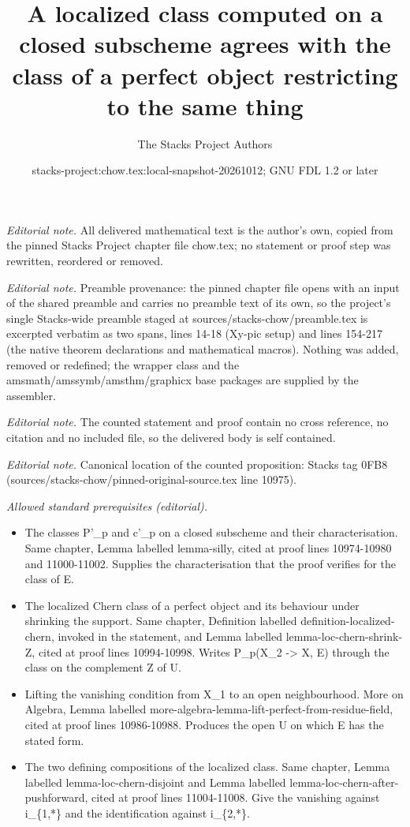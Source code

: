 \documentclass[10pt,a4paper]{amsart}
\title{A localized class computed on a closed subscheme agrees with the class of a perfect object restricting to the same thing}
\author{The Stacks Project Authors}
\date{stacks-project:chow.tex:local-snapshot-20261012; GNU FDL 1.2 or later}
\theoremstyle{plain}
\theoremstyle{definition}
\theoremstyle{remark}
\numberwithin{equation}{subsection}
\begin{document}
\maketitle
\noindent\textit{Editorial note.} All delivered mathematical text is the author's own, copied from the pinned Stacks Project chapter file chow.tex; no statement or proof step was rewritten, reordered or removed.\par\medskip
\noindent\textit{Editorial note.} Preamble provenance: the pinned chapter file opens with an input of the shared preamble and carries no preamble text of its own, so the project's single Stacks-wide preamble staged at sources/stacks-chow/preamble.tex is excerpted verbatim as two spans, lines 14-18 (Xy-pic setup) and lines 154-217 (the native theorem declarations and mathematical macros). Nothing was added, removed or redefined; the wrapper class and the amsmath/amssymb/amsthm/graphicx base packages are supplied by the assembler.\par\medskip
\noindent\textit{Editorial note.} The counted statement and proof contain no cross reference, no citation and no included file, so the delivered body is self contained.\par\medskip
\noindent\textit{Editorial note.} Canonical location of the counted proposition: Stacks tag 0FB8 (sources/stacks-chow/pinned-original-source.tex line 10975).\par\medskip
\noindent\textit{Allowed standard prerequisites (editorial).}\begin{itemize}
\item The classes P'\_p and c'\_p on a closed subscheme and their characterisation. Same chapter, Lemma labelled lemma-silly, cited at proof lines 10974-10980 and 11000-11002. Supplies the characterisation that the proof verifies for the class of E.
\item The localized Chern class of a perfect object and its behaviour under shrinking the support. Same chapter, Definition labelled definition-localized-chern, invoked in the statement, and Lemma labelled lemma-loc-chern-shrink-Z, cited at proof lines 10994-10998. Writes P\_p(X\_2 -> X, E) through the class on the complement Z of U.
\item Lifting the vanishing condition from X\_1 to an open neighbourhood. More on Algebra, Lemma labelled more-algebra-lemma-lift-perfect-from-residue-field, cited at proof lines 10986-10988. Produces the open U on which E has the stated form.
\item The two defining compositions of the localized class. Same chapter, Lemma labelled lemma-loc-chern-disjoint and Lemma labelled lemma-loc-chern-after-pushforward, cited at proof lines 11004-11008. Give the vanishing against i\_\{1,*\} and the identification against i\_\{2,*\}.
\end{itemize}\medskip
\end{document}
